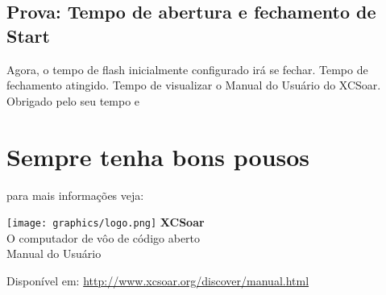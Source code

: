 \documentclass[a4paper,12pt]{refrep}
\begin{document}
\subsection*{\textcolor{flashblue}{Prova: Tempo de abertura e fechamento de Start}}
Agora, o tempo de flash inicialmente configurado irá se fechar.  Tempo de fechamento atingido.  Tempo de visualizar o Manual do Usuário do XCSoar. 
Obrigado pelo seu tempo e


\section*{Sempre tenha bons pousos}%



\newpage
\pagestyle{empty}

\normalsize{para mais informações veja:\\}
\vspace{0.5em}

\begin{center}
    \texttt{[image: graphics/logo.png]}
    \vskip 0.5cm
    \fontsize{50}{0}
    \selectfont\textbf{XCSoar}\\
    \fontsize{12}{12}
    \vspace{0.2em}
    \LARGE{O computador de vôo de código aberto}\\
    \vspace{1.2em}
    \LARGE{Manual do Usuário}\\
    
\vspace{9em}

\end{center}
\begin{flushright}
\normalsize Disponível em: \url{http://www.xcsoar.org/discover/manual.html}\\
\end{flushright}
\end{document}
